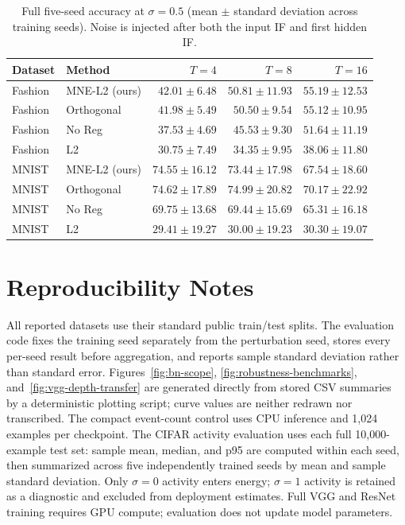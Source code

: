 \documentclass{article}
\begin{document}
\begin{table}[t]
\caption{Full five-seed accuracy at $\sigma=0.5$ (mean $\pm$ standard deviation across training seeds). Noise is injected after both the input IF and first hidden IF.}
\label{tab:full-accuracy}
\centering
\small
\begin{tabular}{llrrr}
\toprule
Dataset & Method & $T=4$ & $T=8$ & $T=16$ \\
\midrule
Fashion & MNE-L2 (ours) & $42.01\pm6.48$ & $50.81\pm11.93$ & $55.19\pm12.53$ \\
Fashion & Orthogonal & $41.98\pm5.49$ & $50.50\pm9.54$  & $55.12\pm10.95$ \\
Fashion & No Reg     & $37.53\pm4.69$ & $45.53\pm9.30$  & $51.64\pm11.19$ \\
Fashion & L2         & $30.75\pm7.49$ & $34.35\pm9.95$  & $38.06\pm11.80$ \\
\midrule
MNIST & MNE-L2 (ours) & $74.55\pm16.12$ & $73.44\pm17.98$ & $67.54\pm18.60$ \\
MNIST & Orthogonal   & $74.62\pm17.89$ & $74.99\pm20.82$ & $70.17\pm22.92$ \\
MNIST & No Reg       & $69.75\pm13.68$ & $69.44\pm15.69$ & $65.31\pm16.18$ \\
MNIST & L2           & $29.41\pm19.27$ & $30.00\pm19.23$ & $30.30\pm19.07$ \\
\bottomrule
\end{tabular}
\end{table}

\FloatBarrier

\section{Reproducibility Notes}

All reported datasets use their standard public train/test splits. The evaluation code fixes the training seed separately from the perturbation seed, stores every per-seed result before aggregation, and reports sample standard deviation rather than standard error. Figures~\ref{fig:bn-scope}, \ref{fig:robustness-benchmarks}, and~\ref{fig:vgg-depth-transfer} are generated directly from stored CSV summaries by a deterministic plotting script; curve values are neither redrawn nor transcribed. The compact event-count control uses CPU inference and 1,024 examples per checkpoint. The CIFAR activity evaluation uses each full 10,000-example test set: sample mean, median, and p95 are computed within each seed, then summarized across five independently trained seeds by mean and sample standard deviation. Only $\sigma=0$ activity enters energy; $\sigma=1$ activity is retained as a diagnostic and excluded from deployment estimates. Full VGG and ResNet training requires GPU compute; evaluation does not update model parameters.


\end{document}
